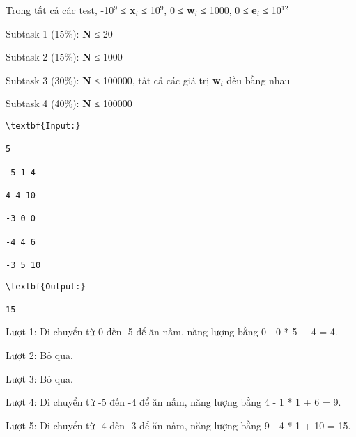 Trong tất cả các test, -10$^9$ ≤ \textbf{x$_i$} ≤ 10$^9$, 0 ≤ \textbf{w$_i$} ≤ 1000, 0 ≤ \textbf{e$_i$} ≤ 10$^12$

Subtask 1 (15\%): \textbf{N} ≤ 20

Subtask 2 (15\%): \textbf{N} ≤ 1000

Subtask 3 (30\%): \textbf{N} ≤ 100000, tất cả các giá trị \textbf{w$_i$} đều bằng nhau

Subtask 4 (40\%): \textbf{N} ≤ 100000
\begin{verbatim}
\textbf{Input:}

5

-5 1 4

4 4 10

-3 0 0

-4 4 6

-3 5 10

\end{verbatim}
\begin{verbatim}
\textbf{Output:}

15

\end{verbatim}
Lượt 1: Di chuyển từ 0 đến -5 để ăn nấm, năng lượng bằng 0 - 0 * 5 + 4 = 4.

Lượt 2: Bỏ qua.

Lượt 3: Bỏ qua.

Lượt 4: Di chuyển từ -5 đến -4 để ăn nấm, năng lượng bằng 4 - 1 * 1 + 6 = 9.

Lượt 5: Di chuyển từ -4 đến -3 để ăn nấm, năng lượng bằng 9 - 4 * 1 + 10 = 15.